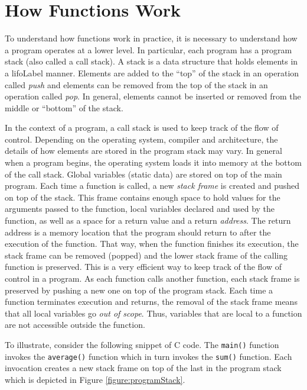 \section{How Functions Work}
\label{section:howFunctionsWork}

To understand how functions work in practice, it is necessary to 
understand how a program operates at a lower level.  In particular,
each program has a  
\gls{program stack} (also called a call stack).  
A \gls{stack} is a data structure that holds elements in a \gls{lifoLabel}
manner.  Elements are added to the ``top'' of the stack in an operation
called \emph{push} and elements can be removed from the top
of the stack in an operation called \emph{pop}.  In general, elements 
cannot be inserted or removed from the middle or ``bottom'' of the 
stack.

In the context of a program, a call stack is used to keep track of the 
flow of control.  Depending on the operating system, compiler and architecture, 
the details of how elements are stored in the program stack may 
vary.  In general when a program begins, the operating 
system loads it into memory at the bottom of the call stack.  Global 
variables (static data) are stored on top of the main program.  Each
time a function is called, a new \emph{stack frame} is created and
pushed on
top of the stack.  This frame contains enough space to hold values
for the arguments passed to the function, local variables declared
and used by the function, as well as a space for a return value and
a return \emph{address}.  The return address is a memory location
that the program should return to after the execution of the function.
That way, when the function finishes its execution, the stack frame
can be removed (popped) and the lower stack frame of the calling
function is preserved.  This is a very efficient way to keep track of
the flow of control in a program.  As each function calls 
another function, each stack frame is preserved by pushing a new
one on top of the program stack.  Each time a function terminates execution and returns, the removal
of the stack frame means that all local variables go \emph{out of
scope}.  Thus, variables that are local to a function are not accessible
outside the function.

To illustrate, consider the following snippet of C code.  The \texttt{main()}
function invokes the \texttt{average()} function which in 
turn invokes the \texttt{sum()} function.  Each invocation 
creates a new stack frame on top of the last in the program stack
which is depicted in Figure \ref{figure:programStack}.

